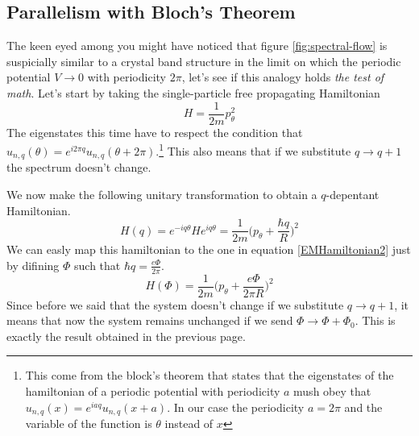     \subsection*{Parallelism with Bloch's Theorem}
    
        The keen eyed among you might have noticed that figure \ref{fig:spectral-flow} is suspicially similar to a crystal band structure in the limit on which the periodic potential $V\to 0$ with periodicity $2\pi$, let's see if this analogy holds \textit{the test of math}. Let's start by taking the single-particle free propagating Hamiltonian 
        \[
            H=\frac 1{2m}p_\theta^2
        \]
        The eigenstates this time have to respect the condition that $u_{n,q}(\theta)=e^{i2\pi q}u_{n,q}(\theta+2\pi)$.\footnote{This come from the block's theorem that states that the eigenstates of the hamiltonian of a periodic potential with periodicity $a$ mush obey that $u_{n,q}(x)=e^{iaq}u_{n,q}(x+a)$. In our case the periodicity $a=2\pi$ and the variable of the function is $\theta$ instead of $x$} This also means that if we substitute $q\to q+1$ the spectrum doesn't change. 

        We now make the following unitary transformation to obtain a $q$-depentant Hamiltonian.
        \[
            H(q)=e^{-iq\theta}He^{iq\theta}=\frac 1{2m}\bigg (p_\theta + \frac {\hbar q}R \bigg)^2
        \]
        We can easly map this hamiltonian to the one in equation \ref{EMHamiltonian2} just by difining $\Phi$ such that $\hbar q= \frac {e\Phi}{2\pi}$. 
        \begin{equation} \label{blochA}
            H(\Phi)=\frac 1{2m}\bigg(p_\theta + \frac{e\Phi}{2\pi R}\bigg)^2
        \end{equation}
        Since before we said that the system doesn't change if we substitute $q\to q+1$, it means that now the system remains unchanged if we send $\Phi \to \Phi+\Phi_0$. This is exactly the result obtained in the previous page.
    
